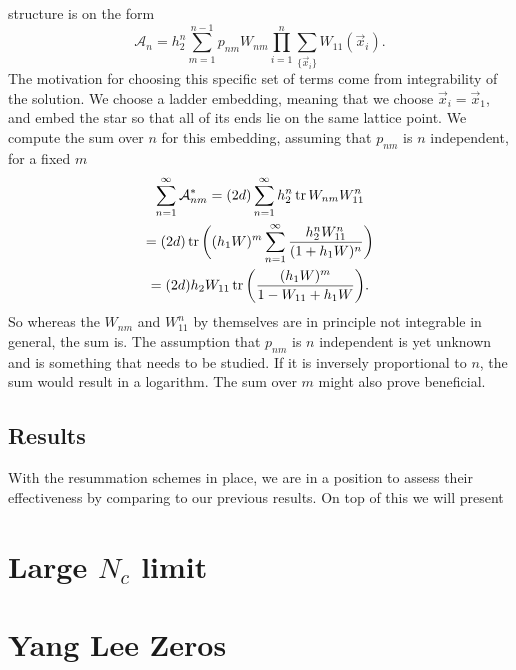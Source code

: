 structure is on the form
%
\begin{equation}
  \mathcal{A}_n = h_2^n \sum_{m=1}^{n-1} p_{nm} W_{nm} \prod_{i=1}^n
  \sum_{\{\vec{x}_i\}} W_{11}(\vec{x}_i).
\end{equation}
%
The motivation for choosing this specific set of terms come from integrability
of the solution. We choose a ladder embedding, meaning that we choose $\vec{x}_i
= \vec{x}_1$, and embed the star so that all of its ends lie on the same lattice
point. We compute the sum over $n$ for this embedding, assuming that $p_{nm}$ is
$n$ independent, for a fixed $m$
%
\begin{multline}
  \sum_{n=1}^{\infty} \mathcal{A}_{nm}^*
    = (2d) \sum_{n=1}^{\infty} h_2^n \operatorname{tr} W_{nm} W_{11}^n \\
    = (2d) \operatorname{tr} \bigg( (h_1 W)^m \sum_{n=1}^{\infty} \frac{h_2^n W_{11}^n}{(1 + h_1 W)^n} \bigg) \\
    = (2d) h_2 W_{11} \operatorname{tr}\bigg( \frac{(h_1 W)^m}{1 - W_{11} + h_1 W} \bigg).
\end{multline}
%
So whereas the $W_{nm}$ and $W_{11}^n$ by themselves are in principle not
integrable in general, the sum is. The assumption that $p_{nm}$ is $n$
independent is yet unknown and is something that needs to be studied. If it is
inversely proportional to $n$, the sum would result in a logarithm. The sum
over $m$ might also prove beneficial.

\subsection{Results}

With the resummation schemes in place, we are in a position to assess their
effectiveness by comparing to our previous results. On top of this we will
present 


\section{Large \texorpdfstring{$N_c$}{Nc} limit} \label{sec:large_nc_study}
\section{Yang Lee Zeros} \label{sec:yang_lee_zeros}
